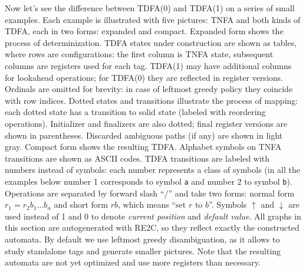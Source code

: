 \documentclass{article}
\newcommand{\Xeq}{\!=\!}
\theoremstyle{definition}
\begin{document}
\begin{multicols}{2}
Now let's see the difference between TDFA(0) and TDFA(1) on a series of small examples.
Each example is illustrated with five pictures:
TNFA and both kinds of TDFA, each in two forms: expanded and compact.
Expanded form shows the process of determinization.
TDFA states under construction are shown as tables, where rows are configurations:
the first column is TNFA state, subsequent columns are registers used for each tag.
TDFA(1) may have additional columns for lookahead operations;
for TDFA(0) they are reflected in register versions.
Ordinals are omitted for brevity: in case of leftmost greedy policy they coincide with row indices.
Dotted states and transitions illustrate the process of mapping:
each dotted state has a transition to solid state (labeled with reordering operations).
Initializer and finalizers are also dotted;
final register versions are shown in parentheses.
Discarded ambiguous paths (if any) are shown in light gray.
Compact form shows the resulting TDFA.
Alphabet symbols on TNFA transitions are shown as ASCII codes.
TDFA transitions are labeled with numbers instead of symbols: each number represents a class of symbols
(in all the examples below number 1 corresponds to symbol \texttt{a} and number 2 to symbol \texttt{b}).
Operations are separated by forward slash ``/'' and take two forms: normal form $r_1 \Xeq r_2 b_1 \dots b_n$
and short form $r b$, which means ``set $r$ to $b$''.
Symbols $\uparrow$ and $\downarrow$ are used instead of 1 and 0 to denote \emph{current position} and \emph{default value}.
All graphs in this section are autogenerated with RE2C, so they reflect exactly the constructed automata.
By default we use leftmost greedy disambiguation, as it allows to study standalone tags and generate smaller pictures.
Note that the resulting automata are not yet optimized and use more registers than necessary.
\\

\end{multicols}
\end{document}
